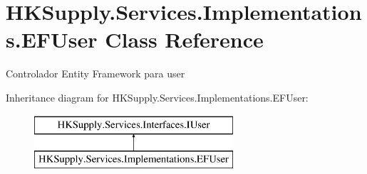\hypertarget{class_h_k_supply_1_1_services_1_1_implementations_1_1_e_f_user}{}\section{H\+K\+Supply.\+Services.\+Implementations.\+E\+F\+User Class Reference}
\label{class_h_k_supply_1_1_services_1_1_implementations_1_1_e_f_user}


Controlador Entity Framework para user  


Inheritance diagram for H\+K\+Supply.\+Services.\+Implementations.\+E\+F\+User\+:\begin{figure}[H]
\begin{center}
\leavevmode
\includegraphics[height=2.000000cm]{class_h_k_supply_1_1_services_1_1_implementations_1_1_e_f_user}
\end{center}
\end{figure}
